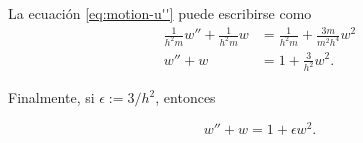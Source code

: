 \documentclass[letterpaper,11pt]{article}
\begin{document}
La ecuación \eqref{eq:motion-u''} puede escribirse como
\begin{align}
\frac{1}{h^2m} w'' + \frac{1}{h^2m} w &= \frac{1}{h^2m} + \frac{3m}{m^2h^4} w^2 \\
w'' + w &= 1 + \frac{3}{h^2} w^2.
\end{align}

Finalmente, si $\epsilon:= 3/h^2$, entonces 
\begin{shaded}
\begin{equation} \label{eq:motion-u''}
w'' + w = 1 + \epsilon w^2.
\end{equation}
\end{shaded}
\end{document}

